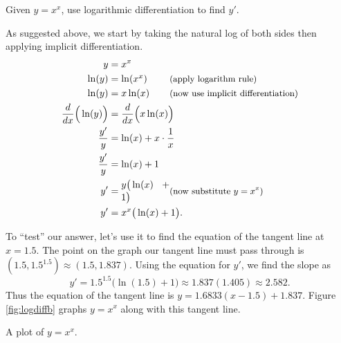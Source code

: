 \begin{example} \label{Ex:2.8.Eg3}
Given $y=x^x$, use logarithmic differentiation to find $y'$.

\solution As suggested above, we start by taking the natural log of both sides then applying implicit differentiation.
\begin{align*}
y &= x^x \\
\ln (y) &= \parbox{50pt}{$\ln (x^x)$} \text{\small (apply logarithm rule)}\\
\ln (y) &= \parbox{50pt}{$x\ln(x)$}  \text{\small (now use implicit differentiation)}\\
\frac{d}{dx}\Big(\ln (y)\Big) &= \frac{d}{dx}\Big(x\ln(x)\Big) \\
\frac{y'}{y} &= \ln(x) + x\cdot\frac1x\\
\frac{y'}{y} &= \ln(x) + 1\\
y' &= \parbox{50pt}{$y\big(\ln(x)+1\big)$} \text{\small (now substitute $y=x^x$)}\\
y' &= x^x\big(\ln(x)+1\big).
\end{align*} 

To ``test'' our answer, let's use it to find the equation of the tangent line at $x=1.5$. The point on the graph our tangent line must pass through is $(1.5, 1.5^{1.5}) \approx (1.5, 1.837)$. Using the equation for $y'$, we find the slope as
$$y' = 1.5^{1.5}\big(\ln(1.5)+1\big) \approx 1.837(1.405) \approx 2.582.$$
Thus the equation of the tangent line is $y = 1.6833(x-1.5)+1.837$. Figure \ref{fig:logdiffb} graphs $y=x^x$ along with this tangent line.
\end{example}

\begin{marginfigure}[-7cm] %
\caption{A plot of $y=x^x$.} \label{fig:logdiffb}
\end{marginfigure}
